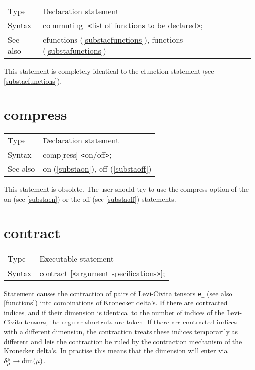 \noindent \begin{tabular}{ll}
Type & Declaration statement\\
Syntax & co[mmuting] {\tt<}list of functions to be declared{\tt>}; \\
See also & cfunctions (\ref{substacfunctions}), functions (\ref{substafunctions})
\end{tabular} \vspace{4mm}

\noindent This statement is completely identical to the 
cfunction statement (see \ref{substacfunctions}). \vspace{10mm}


\section{compress}
\label{substacompress}

\noindent \begin{tabular}{ll}
Type & Declaration statement\\
Syntax & comp[ress] {\tt<}on/off{\tt>};
\\ See also & on (\ref{substaon}), off (\ref{substaoff})
\end{tabular} \vspace{4mm}

\noindent This statement is obsolete. The user should try 
to use the compress option of the on (see \ref{substaon}) or the off (see 
\ref{substaoff}) statements. \vspace{10mm}


\section{contract}
\label{substacontract}

\noindent \begin{tabular}{ll}
Type & Executable statement\\
Syntax & contract [{\tt<}argument specifications{\tt>}];
\end{tabular} \vspace{4mm}

\noindent Statement causes the contraction of pairs of 
Levi-Civita tensors \verb:e_: 
(see also \ref{functions}) into combinations of Kronecker 
delta's. If there are contracted indices, and if 
their dimension is identical to the number of indices of the Levi-Civita 
tensors, the regular shortcuts are taken. If there are contracted indices 
with a different dimension, the contraction treats these indices 
temporarily as different and lets the contraction be ruled by the 
contraction mechanism of the Kronecker delta's. In practise this means that 
the dimension will enter via $\delta^{\mu}_{\mu} \rightarrow {\rm 
dim}(\mu)$. \vspace{4mm}

